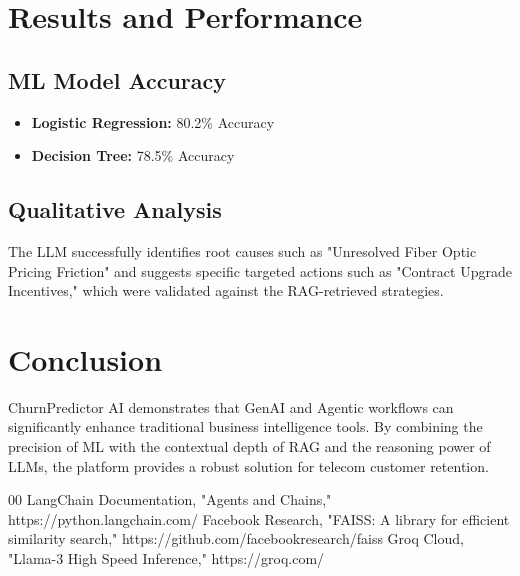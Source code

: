 \documentclass[conference]{IEEEtran}
\begin{document}
\section{Results and Performance}
\subsection{ML Model Accuracy}
\begin{itemize}
    \item \textbf{Logistic Regression:} 80.2\% Accuracy
    \item \textbf{Decision Tree:} 78.5\% Accuracy
\end{itemize}

\subsection{Qualitative Analysis}
The LLM successfully identifies root causes such as "Unresolved Fiber Optic Pricing Friction" and suggests specific targeted actions such as "Contract Upgrade Incentives," which were validated against the RAG-retrieved strategies.

\section{Conclusion}
ChurnPredictor AI demonstrates that GenAI and Agentic workflows can significantly enhance traditional business intelligence tools. By combining the precision of ML with the contextual depth of RAG and the reasoning power of LLMs, the platform provides a robust solution for telecom customer retention.

\begin{thebibliography}{00}
 LangChain Documentation, "Agents and Chains," https://python.langchain.com/
 Facebook Research, "FAISS: A library for efficient similarity search," https://github.com/facebookresearch/faiss
 Groq Cloud, "Llama-3 High Speed Inference," https://groq.com/
\end{thebibliography}
\end{document}
